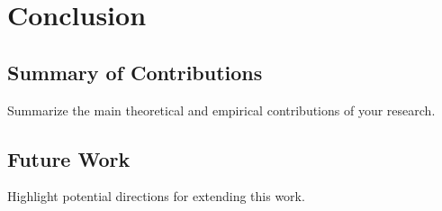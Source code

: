 \chapter{Conclusion}
\label{ch:conclusion}

\section{Summary of Contributions}
Summarize the main theoretical and empirical contributions of your research.

\section{Future Work}
Highlight potential directions for extending this work.